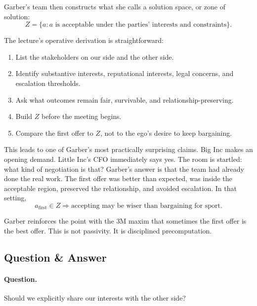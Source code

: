 Garber's team then constructs what she calls a solution space, or zone of solution:
\begin{equation}
Z = \{a : a \text{ is acceptable under the parties' interests and constraints}\}.
\end{equation}

The lecture's operative derivation is straightforward:

\begin{enumerate}
\item List the stakeholders on our side and the other side.
\item Identify substantive interests, reputational interests, legal concerns, and escalation thresholds.
\item Ask what outcomes remain fair, survivable, and relationship-preserving.
\item Build \(Z\) before the meeting begins.
\item Compare the first offer to \(Z\), not to the ego's desire to keep bargaining.
\end{enumerate}

This leads to one of Garber's most practically surprising claims. Big Inc makes an opening demand. Little Inc's CFO immediately says yes. The room is startled: what kind of negotiation is that? Garber's answer is that the team had already done the real work. The first offer was better than expected, was inside the acceptable region, preserved the relationship, and avoided escalation. In that setting,
\begin{equation}
a_{\text{first}} \in Z \Longrightarrow \text{accepting may be wiser than bargaining for sport.}
\end{equation}

Garber reinforces the point with the 3M maxim that sometimes the first offer is the best offer. This is not passivity. It is disciplined precomputation.

\subsection{Question \& Answer}

\paragraph{Question.} Should we explicitly share our interests with the other side?

